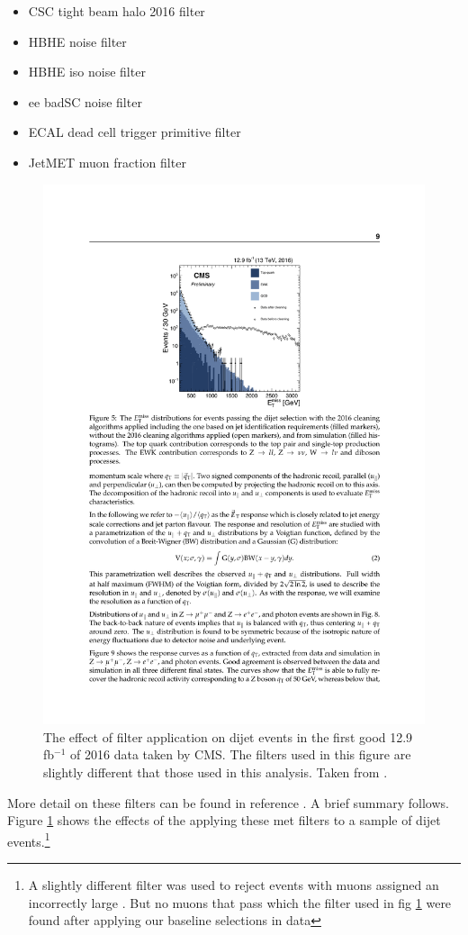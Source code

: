     \begin{itemize}
    \item CSC tight beam halo 2016 filter
    \item HBHE noise filter
    \item HBHE iso noise filter
    \item ee badSC noise filter
    \item ECAL dead cell trigger primitive filter
    \item JetMET muon fraction filter
    \end{itemize}

    \begin{figure}
      \centering
      \includegraphics[width=.48\textwidth]{figures/met_filter_efficacy.pdf}
      \caption{The effect of \MET filter application on dijet events in the first good 12.9 fb$^{-1}$ of 2016 data taken by CMS. The filters used in this figure are slightly different that those used in this analysis. Taken from \cite{cms_met}.}
      \label{fig:met_filters_efficacy}
      \vspace{-10pt}
    \end{figure}

    More detail on these filters can be found in reference \cite[sec 5]{cms_met}. A brief summary follows. Figure \ref{fig:met_filters_efficacy} shows the effects of the applying these met filters to a sample of dijet events.\footnote{A slightly different filter was used to reject events with muons assigned an incorrectly large \pt. But no muons that pass which the filter used in fig \ref{fig:met_filters_efficacy} were found after applying our baseline selections in data}

